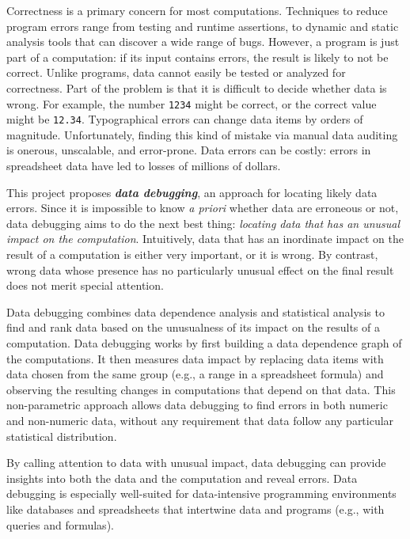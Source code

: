 \projectname{}

Correctness is a primary
concern for most computations. Techniques to reduce program errors range from testing and
runtime assertions, to dynamic and static analysis tools that can
discover a wide range of bugs. However, a program is just part of
a computation: if its input contains errors, the result
is likely to not be correct. Unlike programs, data
cannot easily be tested or analyzed for correctness.  Part of the
problem is that it is difficult to decide whether data
is wrong. For example, the number \texttt{1234}
might be correct, or the correct value might
be \texttt{12.34}. Typographical errors can change data items by
orders of magnitude. Unfortunately, finding this kind of mistake via
manual data auditing is onerous, unscalable, and error-prone. Data
errors can be costly: errors in spreadsheet data have led to losses of
millions of dollars.

This project proposes \emph{\bf data debugging}, an approach for
locating likely data errors. Since it is impossible to know \emph{a
priori} whether data are erroneous or not, data debugging aims to do
the next best thing: \emph{locating data that has an unusual impact on
the computation}. Intuitively, data that has an inordinate impact on
the result of a computation is either very important, or it is wrong. By
contrast, wrong data whose presence has no particularly unusual effect
on the final result does not merit special attention.

Data debugging combines data dependence analysis and statistical
analysis to find and rank data based on the unusualness of its impact
on the results of a computation. Data debugging works by first
building a data dependence graph of the computations. It then measures
data impact by replacing data items with data chosen from the same
group (e.g., a range in a spreadsheet formula) and observing the
resulting changes in computations that depend on that data. This
non-parametric approach allows data debugging to find errors in both
numeric and non-numeric data, without any requirement that data follow
any particular statistical distribution.

By calling attention to data with unusual impact, data debugging can
provide insights into both the data and the computation and reveal
errors. Data debugging is especially well-suited for data-intensive
programming environments like databases and spreadsheets that
intertwine data and programs (e.g., with queries and formulas). 

